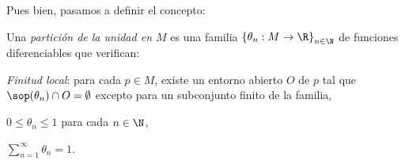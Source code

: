 Pues bien, pasamos a definir el concepto:
\begin{ndef}
  Una \emph{partición de la unidad en $M$} es una familia $\left\{ \theta_{n}:
    M\to \R \right\}_{n\in\N}$ de funciones diferenciables que verifican:
  \begin{nlist}
  \item
    \emph{Finitud local}: para cada $p\in M$, existe un entorno abierto $O$ de
    $p$ tal que $\sop(\theta_{n})\cap O = \emptyset$ excepto para un subconjunto
    finito de la familia,
  \item
    $0\leq \theta_{n}\leq 1$ para cada $n\in\N$,
  \item
    $\sum_{n=1}^{\infty} \theta_{n} = 1$.
  \end{nlist}
\end{ndef}

